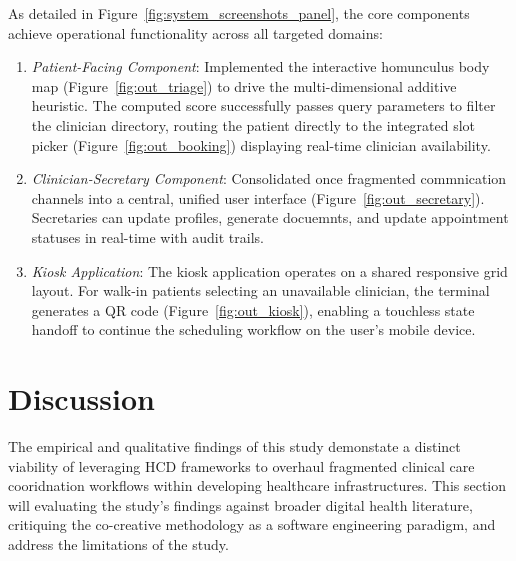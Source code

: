 \documentclass[manuscript, screen, review]{acmart}
\begin{document}
As detailed in Figure~\ref{fig:system_screenshots_panel}, the core components achieve operational functionality across all targeted domains: 
\begin{enumerate}
  \item \textit{Patient-Facing Component}: Implemented the interactive homunculus body map (Figure~\ref{fig:out_triage}) to drive the multi-dimensional additive heuristic. The computed score successfully passes query parameters to filter the clinician directory, routing the patient directly to the integrated slot picker (Figure~\ref{fig:out_booking}) displaying real-time clinician availability. 
  \item \textit{Clinician-Secretary Component}: Consolidated once fragmented commnication channels into a central, unified user interface (Figure~\ref{fig:out_secretary}). Secretaries can update profiles, generate docuemnts, and update appointment statuses in real-time with audit trails. 
  \item \textit{Kiosk Application}: The kiosk application operates on a shared responsive grid layout. For walk-in patients selecting an unavailable clinician, the terminal generates a QR code (Figure~\ref{fig:out_kiosk}), enabling a touchless state handoff to continue the scheduling workflow on the user's mobile device. 
\end{enumerate}


\section{Discussion}
\label{sec:discussion}
The empirical and qualitative findings of this study demonstate a distinct viability of leveraging HCD frameworks to overhaul fragmented clinical care cooridnation workflows within developing healthcare infrastructures. This section will evaluating the study's findings against broader digital health literature, critiquing the co-creative methodology as a software engineering paradigm, and address the limitations of the study. 
\end{document}
